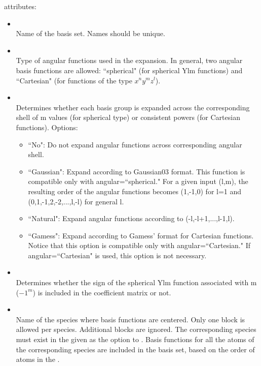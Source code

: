  attributes:

\begin{itemize}
\item {}\\
Name of the basis set. Names should be unique.
\item {}\\
Type of angular functions used in the expansion. In general, two angular basis functions are allowed: ``spherical" (for spherical Ylm functions) and ``Cartesian" (for functions of the type $x^{n}y^{m}z^{l}$).  
\item {}\\
Determines whether each basis group is expanded across the corresponding shell of m values (for spherical type) or consistent powers (for Cartesian functions). Options:
\begin{itemize}
\item ``No": Do not expand angular functions across corresponding angular shell.
\item ``Gaussian": Expand according to Gaussian03 format. This function is compatible only with angular=``spherical." For a given input (l,m), the resulting order of the angular functions becomes (1,-1,0) for l=1 and (0,1,-1,2,-2,...,l,-l) for general l.
\item ``Natural": Expand angular functions according to (-l,-l+1,...,l-1,l). 
\item ``Gamess": Expand according to Gamess' format for Cartesian functions. Notice that this option is compatible only with angular=``Cartesian." If angular=``Cartesian" is used, this option is not necessary.
\end{itemize}
\item {}\\ 
Determines whether the sign of the spherical Ylm function associated with m ($-1^{m}$) is included in the coefficient matrix or not.
\item {}\\
Name of the species where basis functions are centered. Only one  block is allowed per species. Additional blocks are ignored. The corresponding species must exist in the  given as the  option to . Basis functions for all the atoms of the corresponding species are included in the basis set, based on the order of atoms in the .
\end{itemize}

